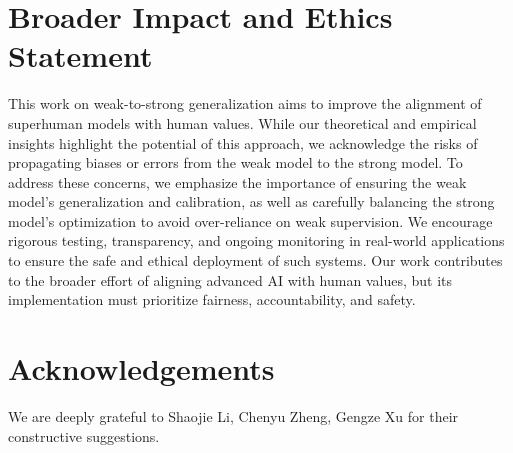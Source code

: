 \section*{Broader Impact and Ethics Statement}

This work on weak-to-strong generalization aims to improve the alignment of superhuman models with human values. 
While our theoretical and empirical insights highlight the potential of this approach, we acknowledge the risks of propagating biases or errors from the weak model to the strong model. 
To address these concerns, we emphasize the importance of ensuring the weak model's generalization and calibration, as well as carefully balancing the strong model's optimization to avoid over-reliance on weak supervision. 
We encourage rigorous testing, transparency, and ongoing monitoring in real-world applications to ensure the safe and ethical deployment of such systems. 
Our work contributes to the broader effort of aligning advanced AI with human values, but its implementation must prioritize fairness, accountability, and safety.



\section*{Acknowledgements}
We are deeply grateful to Shaojie Li, Chenyu Zheng, Gengze Xu for their  constructive suggestions.




